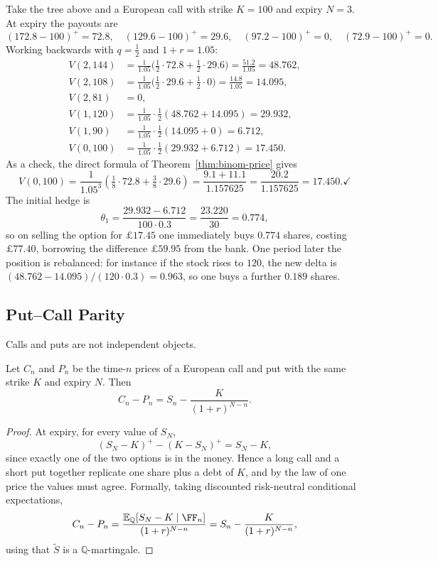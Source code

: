 \documentclass[a4paper]{scrartcl}
\newcommand{\QQ}{\mathbb{Q}}
\begin{document}
\begin{example}\label{ex:binom-call}
	Take the tree above and a European call with strike $K = 100$ and expiry $N=3$. At expiry the payouts are
	$$
	(172.8-100)^+ = 72.8,\quad (129.6-100)^+ = 29.6,\quad (97.2-100)^+ = 0,\quad (72.9-100)^+ = 0.
	$$
	Working backwards with $q = \tfrac12$ and $1+r = 1.05$:
	\begin{align*}
		V(2,144) &= \tfrac{1}{1.05}\big(\tfrac12\cdot 72.8 + \tfrac12\cdot29.6\big) = \tfrac{51.2}{1.05} = 48.762,\\
		V(2,108) &= \tfrac{1}{1.05}\big(\tfrac12\cdot 29.6 + \tfrac12\cdot 0\big) = \tfrac{14.8}{1.05} = 14.095,\\
		V(2,81) &= 0,\\
		V(1,120) &= \tfrac{1}{1.05}\cdot\tfrac12(48.762+14.095) = 29.932,\\
		V(1,90) &= \tfrac{1}{1.05}\cdot\tfrac12(14.095 + 0) = 6.712,\\
		V(0,100) &= \tfrac{1}{1.05}\cdot\tfrac12(29.932+6.712) = 17.450.
	\end{align*}
	As a check, the direct formula of Theorem~\ref{thm:binom-price} gives
	$$
	V(0,100) = \frac{1}{1.05^3}\left(\tfrac18\cdot 72.8 + \tfrac38\cdot 29.6\right) = \frac{9.1+11.1}{1.157625} = \frac{20.2}{1.157625} = 17.450. \checkmark
	$$
	The initial hedge is
	$$
	\theta_1 = \frac{29.932 - 6.712}{100\cdot 0.3} = \frac{23.220}{30} = 0.774,
	$$
	so on selling the option for $\pounds 17.45$ one immediately buys $0.774$ shares, costing $\pounds 77.40$, borrowing the difference $\pounds 59.95$ from the bank. One period later the position is rebalanced: for instance if the stock rises to $120$, the new delta is $(48.762-14.095)/(120\cdot0.3) = 0.963$, so one buys a further $0.189$ shares.
\end{example}

\subsection{Put--Call Parity}

Calls and puts are not independent objects.

\begin{proposition}\label{prop:parity}
	Let $C_n$ and $P_n$ be the time-$n$ prices of a European call and put with the same strike $K$ and expiry $N$. Then
	$$
	C_n - P_n = S_n - \frac{K}{(1+r)^{N-n}}.
	$$
\end{proposition}

\begin{proof}
	At expiry, for every value of $S_N$,
	$$
	(S_N - K)^+ - (K-S_N)^+ = S_N - K,
	$$
	since exactly one of the two options is in the money. Hence a long call and a short put together replicate one share plus a debt of $K$, and by the law of one price the values must agree. Formally, taking discounted risk-neutral conditional expectations,
	$$
	C_n - P_n = \frac{\EE_\QQ[S_N - K \mid\FF_n]}{(1+r)^{N-n}} = S_n - \frac{K}{(1+r)^{N-n}},
	$$
	using that $\tilde S$ is a $\QQ$-martingale.
\end{proof}
\end{document}

